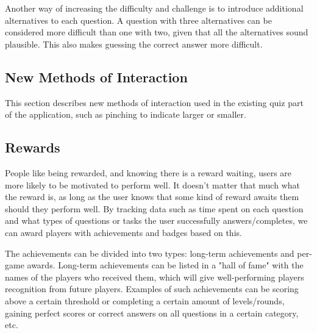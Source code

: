 Another way of increasing the difficulty and challenge is to introduce additional alternatives to each question. A question with three alternatives can be considered more difficult than one with two, given that all the alternatives sound plausible. This also makes guessing the correct answer more difficult.


\subsection{New Methods of Interaction}

This section describes new methods of interaction used in the existing quiz part of the application, such as pinching to indicate larger or smaller.


\subsection{Rewards}

People like being rewarded, and knowing there is a reward waiting, users are more likely to be motivated to perform well. It doesn't matter that much what the reward is, as long as the user knows that some kind of reward awaits them should they perform well. By tracking data such as time spent on each question and what types of questions or tasks the user successfully answers/completes, we can award players with achievements and badges based on this.

The achievements can be divided into two types: long-term achievements and per-game awards. Long-term achievements can be listed in a "hall of fame" with the names of the players who received them, which will give well-performing players recognition from future players. Examples of such achievements can be scoring above a certain threshold or completing a certain amount of levels/rounds, gaining perfect scores or correct answers on all questions in a certain category, etc.

